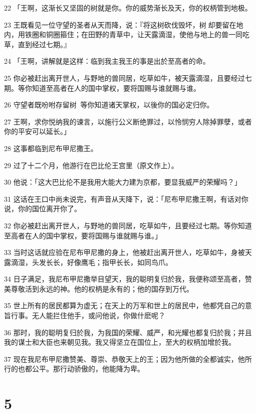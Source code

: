 \par 22 「王啊，这渐长又坚固的树就是你。你的威势渐长及天，你的权柄管到地极。
\par 23 王既看见一位守望的圣者从天而降，说：『将这树砍伐毁坏，树却要留在地内，用铁圈和铜圈箍住；在田野的青草中，让天露滴湿，使他与地上的兽一同吃草，直到经过七期。』
\par 24 「王啊，讲解就是这样：临到我主我王的事是出於至高者的命。
\par 25 你必被赶出离开世人，与野地的兽同居，吃草如牛，被天露滴湿，且要经过七期。等你知道至高者在人的国中掌权，要将国赐与谁就赐与谁。
\par 26 守望者既吩咐存留树，等你知道诸天掌权，以後你的国必定归你。
\par 27 王啊，求你悦纳我的谏言，以施行公义断绝罪过，以怜悯穷人除掉罪孽，或者你的平安可以延长。」
\par 28 这事都临到尼布甲尼撒王。
\par 29 过了十二个月，他游行在巴比伦王宫里（原文作上）。
\par 30 他说：「这大巴比伦不是我用大能大力建为京都，要显我威严的荣耀吗？」
\par 31 这话在王口中尚未说完，有声音从天降下，说：「尼布甲尼撒王啊，有话对你说，你的国位离开你了。
\par 32 你必被赶出离开世人，与野地的兽同居，吃草如牛，且要经过七期。等你知道至高者在人的国中掌权，要将国赐与谁就赐与谁。」
\par 33 当时这话就应验在尼布甲尼撒的身上，他被赶出离开世人，吃草如牛，身被天露滴湿，头发长长，好像鹰毛；指甲长长，如同鸟爪。
\par 34 日子满足，我尼布甲尼撒举目望天，我的聪明复归於我，我便称颂至高者，赞美尊敬活到永远的神。他的权柄是永有的；他的国存到万代。
\par 35 世上所有的居民都算为虚无；在天上的万军和世上的居民中，他都凭自己的意旨行事。无人能拦住他手，或问他说，你做什麽呢？
\par 36 那时，我的聪明复归於我，为我国的荣耀、威严，和光耀也都复归於我；并且我的谋士和大臣也来朝见我。我又得坚立在国位上，至大的权柄加增於我。
\par 37 现在我尼布甲尼撒赞美、尊崇、恭敬天上的王；因为他所做的全都诚实，他所行的也都公平。那行动骄傲的，他能降为卑。

\chapter{5}

